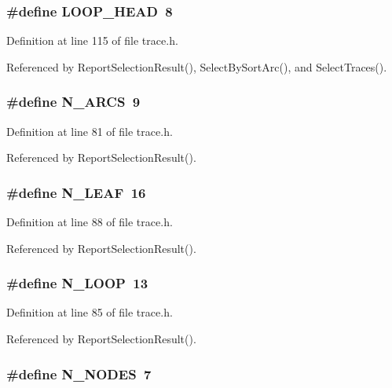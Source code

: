 \subsubsection{\setlength{\rightskip}{0pt plus 5cm}\#define LOOP\_\-HEAD~8}\label{trace_8h_442cb4b95a83ddee465719405ba74c5c}




Definition at line 115 of file trace.h.

Referenced by Report\-Selection\-Result(), Select\-By\-Sort\-Arc(), and Select\-Traces().
\subsubsection{\setlength{\rightskip}{0pt plus 5cm}\#define N\_\-ARCS~9}\label{trace_8h_3dce91ea49b09f4f3ce3176c5fac11f7}




Definition at line 81 of file trace.h.

Referenced by Report\-Selection\-Result().
\subsubsection{\setlength{\rightskip}{0pt plus 5cm}\#define N\_\-LEAF~16}\label{trace_8h_1b23519ddb06f484ddbc6031e739a6e9}




Definition at line 88 of file trace.h.

Referenced by Report\-Selection\-Result().
\subsubsection{\setlength{\rightskip}{0pt plus 5cm}\#define N\_\-LOOP~13}\label{trace_8h_da9394768aa83b16d46a4f1329a07f23}




Definition at line 85 of file trace.h.

Referenced by Report\-Selection\-Result().
\subsubsection{\setlength{\rightskip}{0pt plus 5cm}\#define N\_\-NODES~7}\label{trace_8h_16c19de9b8eca127fb6d5dad6b43aa49}





